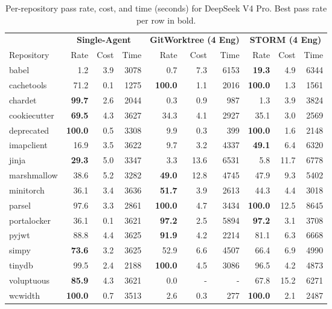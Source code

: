 \documentclass{article}
\begin{document}
\begin{table}[t!]
  \caption{Per-repository pass rate, cost, and time (seconds) for DeepSeek V4 Pro. Best pass rate per row in bold.}
  \label{tab:per-repo-deepseek}
  \centering
  \small
  \begin{tabular}{l rrr rrr rrr}
    \toprule
    & \multicolumn{3}{c}{\textbf{Single-Agent}} & \multicolumn{3}{c}{\textbf{GitWorktree (4 Eng)}} & \multicolumn{3}{c}{\textbf{STORM (4 Eng)}} \\
    \cmidrule(lr){2-4} \cmidrule(lr){5-7} \cmidrule(lr){8-10}
    Repository & Rate & Cost & Time & Rate & Cost & Time & Rate & Cost & Time \\
    \midrule
    babel        &   1.2 &  3.9 & 3078 &   0.7 &  7.3 & 6153 & \textbf{19.3} &  4.9 & 6344 \\
    cachetools   &  71.2 &  0.1 & 1275 & \textbf{100.0} &  1.1 & 2016 & \textbf{100.0} &  1.3 & 1561 \\
    chardet      & \textbf{99.7} &  2.6 & 2044 &   0.3 &  0.9 &  987 &   1.3 &  3.9 & 3824 \\
    cookiecutter & \textbf{69.5} &  4.3 & 3627 &  34.3 &  4.1 & 2927 &  35.1 &  3.0 & 2569 \\
    deprecated   & \textbf{100.0} &  0.5 & 3308 &   9.9 &  0.3 &  399 & \textbf{100.0} &  1.6 & 2148 \\
    imapclient   &  16.9 &  3.5 & 3622 &   9.7 &  3.2 & 4337 & \textbf{49.1} &  6.4 & 6320 \\
    jinja        & \textbf{29.3} &  5.0 & 3347 &   3.3 & 13.6 & 6531 &   5.8 & 11.7 & 6778 \\
    marshmallow  &  38.6 &  5.2 & 3282 & \textbf{49.0} & 12.8 & 4745 &  47.9 &  9.3 & 5402 \\
    minitorch    &  36.1 &  3.4 & 3636 & \textbf{51.7} &  3.9 & 2613 &  44.3 &  4.4 & 3018 \\
    parsel       &  97.6 &  3.3 & 2861 & \textbf{100.0} &  4.7 & 3434 & \textbf{100.0} & 12.5 & 8645 \\
    portalocker  &  36.1 &  0.1 & 3621 & \textbf{97.2} &  2.5 & 5894 & \textbf{97.2} &  3.1 & 3708 \\
    pyjwt        &  88.8 &  4.4 & 3625 & \textbf{91.9} &  4.2 & 2214 &  81.1 &  6.3 & 6668 \\
    simpy        & \textbf{73.6} &  3.2 & 3625 &  52.9 &  6.6 & 4507 &  66.4 &  6.9 & 4990 \\
    tinydb       &  99.5 &  2.4 & 2188 & \textbf{100.0} &  4.5 & 3086 &  96.5 &  4.2 & 4873 \\
    voluptuous   & \textbf{85.9} &  4.3 & 3621 &     0.0 &    - &    - &  67.8 & 15.2 & 6271 \\
    wcwidth      & \textbf{100.0} &  0.7 & 3513 &   2.6 &  0.3 &  277 & \textbf{100.0} &  2.1 & 2487 \\
    \bottomrule
  \end{tabular}
\end{table}
\end{document}
